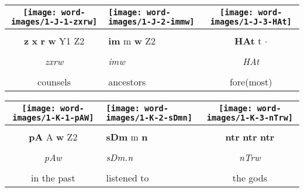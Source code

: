 \vspace{7.5mm}

\begin{tabularx}{\linewidth}{cYc}
	\texttt{[image: word-images/1-J-1-zxrw]} &
	\texttt{[image: word-images/1-J-2-immw]} &
	\texttt{[image: word-images/1-J-3-HAt]} \\
	\hline \\ 
	\textbf{z} \textbf{x} \textbf{r} \textbf{w} Y1 Z2 &
	\textbf{im} m \textbf{w} Z2 &
	\textbf{HAt} t $\cdot$ \\
	\hline \\ 
	\textit{zxrw} & \textit{imw} & \textit{HAt} \\
	\hline \\ 
	counsels & ancestors & fore(most)
\end{tabularx}

\vspace{7.5mm}

\begin{tabularx}{\linewidth}{cYc}
	\texttt{[image: word-images/1-K-1-pAW]} &
	\texttt{[image: word-images/1-K-2-sDmn]} &
	\texttt{[image: word-images/1-K-3-nTrw]} \\
	\hline \\ 
	\textbf{pA} A \textbf{w} Z2 &
	\textbf{sDm} m \textbf{n} &
	\textbf{ntr} \textbf{ntr} \textbf{ntr} \\
	\hline \\ 
	\textit{pAw} & \textit{sDm.n} & \textit{nTrw} \\
	\hline \\ 
	in the past & listened to & the gods
\end{tabularx}

\vspace*{\fill}

\pagebreak

